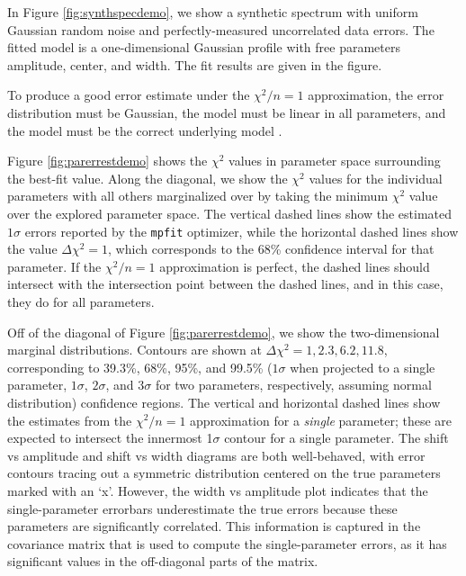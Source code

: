 \documentclass[twocolumn]{aastex62}
\begin{document}
In Figure \ref{fig:synthspecdemo}, we show a synthetic spectrum with uniform
Gaussian random noise and perfectly-measured uncorrelated data errors.
The fitted model is a one-dimensional Gaussian profile with free parameters
amplitude, center, and width.  The fit results are given in the figure.

To produce a good error estimate under the $\chi^2/n=1$ approximation, the error
distribution must be Gaussian, the model must be
linear in all parameters, and the model must be the correct underlying model
\citep{Andrae2010b}.

Figure \ref{fig:parerrestdemo} shows the $\chi^2$ values in parameter space
surrounding the best-fit value.  Along the diagonal, we show the $\chi^2$
values for the individual parameters with all others marginalized over
by taking the minimum $\chi^2$ value over the explored parameter space.  The vertical
dashed lines show the estimated $1\sigma$ errors reported by the \texttt{mpfit}
optimizer, while the
horizontal dashed lines show the value $\Delta\chi^2=1$, which corresponds to
the 68\% confidence interval for that parameter.  If the $\chi^2/n=1$
approximation is perfect, the dashed lines should intersect with the intersection
point between the dashed lines, and in this case, they do for all parameters.  

Off of the diagonal of Figure \ref{fig:parerrestdemo}, we show the
two-dimensional marginal distributions.  Contours
are shown at
$\Delta\chi^2=1,2.3,6.2,11.8$, corresponding to 39.3\%, 68\%, 95\%, and 99.5\%
($1\sigma$ when projected to a single parameter, $1\sigma$, $2\sigma$, and
$3\sigma$ for two parameters, respectively, assuming normal
distribution) confidence
regions.  The
vertical and horizontal dashed lines show the estimates from the $\chi^2/n=1$
approximation for a \emph{single} parameter; these are  expected to intersect
the innermost 1$\sigma$ contour for a single parameter. 
The shift vs amplitude and shift vs width diagrams are both well-behaved, with error
contours tracing out a symmetric distribution centered on the true parameters marked
with an `x'.
However, the width vs amplitude plot indicates that the single-parameter
errorbars underestimate the true errors because these parameters are
significantly correlated.  This information is captured in the covariance
matrix that is used to compute the single-parameter errors, as it has
significant values in the off-diagonal parts of the matrix.  
\end{document}

